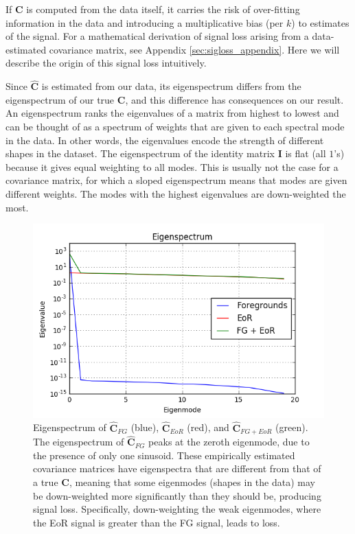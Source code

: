 \documentclass[preprint2,numberedappendix,tighten]{aastex6}  %
\begin{document}
If $\textbf{C}$ is computed from the data itself, it carries the risk of over-fitting information in the data and introducing a 
multiplicative bias (per $k$) to estimates of the signal. For a mathematical derivation of signal loss arising from a data-
estimated covariance matrix, see Appendix \ref{sec:sigloss_appendix}. Here we will describe the origin of this signal loss 
intuitively.

Since $\hat{\textbf{C}}$ is estimated from our data, its eigenspectrum differs from the eigenspectrum of our 
true $\textbf{C}$, and this difference has consequences on our result. An eigenspectrum ranks the eigenvalues of a matrix from 
highest to lowest and can be thought of as a spectrum of weights that are given to each spectral mode in the data. In other 
words, the eigenvalues encode the strength of different shapes in the dataset. The eigenspectrum of the identity matrix $
\textbf{I}$ is flat (all $1$'s) because it gives equal weighting to all modes. This is usually not the case for a covariance matrix, 
for which a sloped eigenspectrum means that modes are given different weights. The modes with the highest eigenvalues are 
down-weighted the most. 

\begin{figure}
	\centering
	\includegraphics[trim={0.3cm 0.2cm 0.3cm 0.3cm},clip,width=\columnwidth]{plots/toy_sigloss2.png}
	\caption{Eigenspectrum of $\hat{\textbf{C}}_{FG}$ (blue), $\hat{\textbf{C}}_{EoR}$ (red), and $\hat{\textbf{C}}_{FG+EoR}$ 
(green). The eigenspectrum of $\hat{\textbf{C}}_{FG}$ peaks at the zeroth eigenmode, due to the presence of only one 
sinusoid. These empirically estimated covariance matrices have eigenspectra that are different from that of a true $\textbf{C}$, 
meaning that some eigenmodes (shapes in the data) may be down-weighted more significantly than they should be, producing 
signal loss. Specifically, down-weighting the weak eigenmodes, where the EoR signal is greater than the FG signal, leads to 
loss.}
	\label{fig:toy_sigloss2}
\end{figure}
\end{document}
